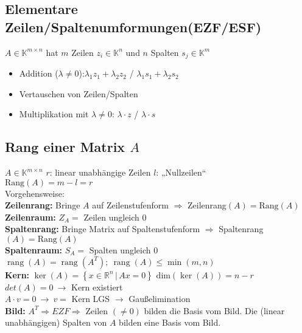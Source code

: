 \documentclass[7pt,a4paper]{scrartcl}
\newcommand{\dme}[2]{\ensuremath{\left\{#1\,\vert\,#2 \right\}}}
\begin{document}
\begin{multicols}{3}
\subsection{Elementare Zeilen/Spaltenumformungen(EZF/ESF)}
$A \in \mathbb K^{m\times n}$ hat $m$ Zeilen $z_i\in \mathbb K^n$ und $n$ Spalten $s_j\in \mathbb K^m$
\begin{itemize}\itemsep0pt
	\item Addition ($\lambda\ne 0$):\quad $\lambda_1 z_1 + \lambda_2  z_2$ \quad / \quad $\lambda_1  s_1 + \lambda_2 s_2$
	\item Vertauschen von Zeilen/Spalten
	\item Multiplikation mit $\lambda\ne 0$: \quad $\lambda \cdot z$ \quad  / \quad  $\lambda \cdot s$
\end{itemize}

\subsection{Rang einer Matrix $A$}
$A\in \mathbb K^{m\times n}$ \quad $r$: linear unabhängige Zeilen \quad $l$: „Nullzeilen“ \\ 
$\mathrm{Rang}(A)=m-l=r$\\  
Vorgehensweise: \\
\textbf{Zeilenrang:} Bringe $A$ auf Zeilenstufenform $\Rightarrow$ Zeilenrang$(A) = \mathrm{Rang}(A)$ \\
\textbf{Zeilenraum:}  $Z_A = $ Zeilen ungleich $0$ \\
\textbf{Spaltenrang:} Bringe Matrix auf Spaltenstufenform $\Rightarrow$ Spaltenrang$(A)= \mathrm{Rang}(A)$ \\
\textbf{Spaltenraum:} $S_A = $ Spalten ungleich $0$ \\
$\operatorname {rang}(A)=\operatorname {rang}(A^{T}); ~\operatorname{rang}(A)\leq \min(m,n)$ \\
\textbf{Kern:} $\ker(A) = \dme{x \in \mathbb R^n}{Ax= 0}$ \qquad $\mathrm{dim}(\ker(A))=n-r$ \\
\quad $det(A)=0 ~\rightarrow$ Kern existiert \\
	$A \cdot v=0 ~ \rightarrow ~ v=$ Kern \qquad LGS $\rightarrow$ Gaußelimination \\
\textbf{Bild: } $A^T \Rightarrow EZF \Rightarrow $ Zeilen $(\not= 0)$ bilden die Basis vom Bild. Die (linear unabhängigen) Spalten von $A$ bilden eine Basis vom Bild.

\end{multicols}
\end{document}
